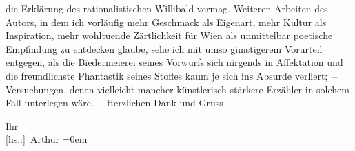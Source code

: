                die Erklärung des rationalistischen Willibald vermag. Weiteren Arbeiten des Autors, in dem ich vorläufig mehr Geschmack als Eigenart,
               mehr Kultur als Inspiration, mehr wohltuende Zärtlichkeit für Wien als unmittelbar poetische Empfindung zu entdecken glaube,
               sehe ich mit umso günstigerem Vorurteil entgegen, als die Biedermeierei seines
               Vorwurfs \introOben{}sich\introOben{} nirgends in Affektation und die freundlichste
               Phantastik seines Stoffes kaum je sich ins Absurde verliert; – Versuchungen, denen
               vielleicht mancher künstlerisch stärkere Erzähler in solchem Fall unterlegen wäre. –
               Herzlichen Dank und Gruss\pend
           
\pstart
           Ihr{\\[\baselineskip]}\spacefill\mbox{{[}hs.:{]} Arthur}\pend
           \leftskip=0em{}\endnumbering{}  \newcommand{\dateiname}{L02238}\newcommand{\titel}{Arthur Schnitzler an Hugo von Hofmannsthal, 22. 8. 1916}\newcommand{\editorInnen}{Martin Anton Müller und Gerd-Hermann Susen}
